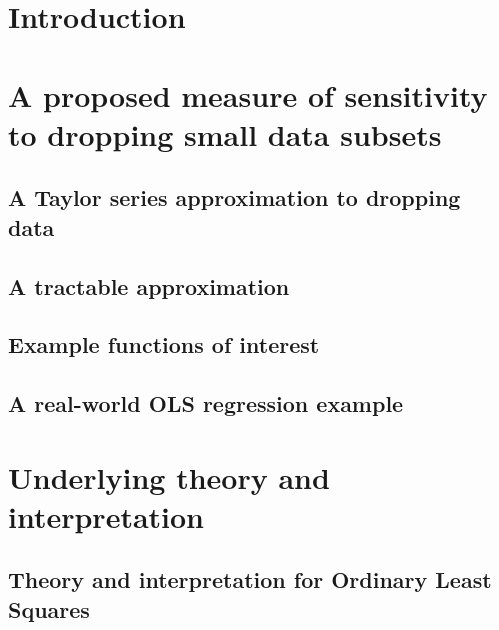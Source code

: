 \documentclass[english,12pt]{article}\usepackage{lmodern} %
\theoremstyle{thmstyleone}%
\begin{document}
\maketitle
{}

\section{Introduction}


\section{A proposed measure of sensitivity to dropping small data subsets}
    

    \subsection{A Taylor series approximation to dropping data}
    

    \subsection{A tractable approximation}
    

    \subsection{Example functions of interest}
    

    \subsection{A real-world OLS regression example}
    

\section{Underlying theory and interpretation} 
    

    \subsection{Theory and interpretation for Ordinary Least Squares}
    
\end{document}
